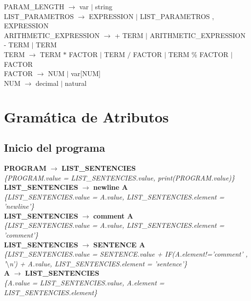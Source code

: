 \documentclass[10pt,a4paper]{article}
\begin{document}
PARAM\_LENGTH $\rightarrow$ var $|$ string \\

LIST\_PARAMETROS $\rightarrow$ EXPRESSION $|$ LIST\_PARAMETROS , EXPRESSION \\

ARITHMETIC\_EXPRESSION $\rightarrow$  + TERM $|$ ARITHMETIC\_EXPRESSION - TERM $|$ TERM \\

TERM $\rightarrow$ TERM $*$ FACTOR $|$ TERM $/$ FACTOR $|$ TERM \% FACTOR $|$ FACTOR \\

FACTOR $\rightarrow$ NUM $|$ var[NUM] \\

NUM $\rightarrow$ decimal $|$ natural



\newpage

\section{Gramática de Atributos}

\subsection{Inicio del programa}
\textbf{PROGRAM} $\rightarrow$ \textbf{LIST\_SENTENCIES} \\
\textit{\{PROGRAM.value = LIST\_SENTENCIES.value, print(PROGRAM.value)\}}\\

\textbf{LIST\_SENTENCIES} $\rightarrow$ \textbf{newline A}\\
\textit{\{LIST\_SENTENCIES.value = A.value, LIST\_SENTENCIES.element = 'newline'\}} \\

\textbf{LIST\_SENTENCIES} $\rightarrow$ \textbf{comment A}\\
\textit{\{LIST\_SENTENCIES.value = A.value, LIST\_SENTENCIES.element = 'comment'\}} \\

\textbf{LIST\_SENTENCIES} $\rightarrow$ \textbf{SENTENCE A}\\
\textit{\{LIST\_SENTENCIES.value = SENTENCE.value + IF(A.element!='comment' , '$\setminus$n') + A.value, LIST\_SENTENCIES.element = 'sentence'\}} \\

\textbf{A} $\rightarrow$ \textbf{LIST\_SENTENCIES}\\
\textit{\{A.value = LIST\_SENTENCIES.value, A.element = LIST\_SENTENCIES.element\}} \\
\end{document}
